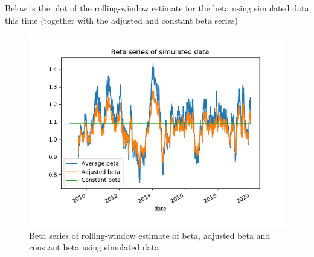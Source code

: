 \documentclass[10pt]{article}
\newenvironment{exercise}[2][Exercise]{\begin{trivlist}
  \item[\hskip \labelsep {\bfseries #1}\hskip \labelsep {\bfseries #2.}]}{\end{trivlist}}
\begin{document}
\begin{exercise}{2}
	Below is the plot of the rolling-window estimate for the beta using simulated data this time (together with the adjusted and constant beta series)
	
	\begin{figure}[H]
	
		\centering
		\includegraphics[scale=0.8]{figures/ex2_3.png}	
		\caption{Beta series of rolling-window estimate of beta, adjusted beta and constant beta using simulated data}
		\label{fig:ex2_3}
				
	\end{figure}
		
\end{exercise}

\newpage
\end{document}
